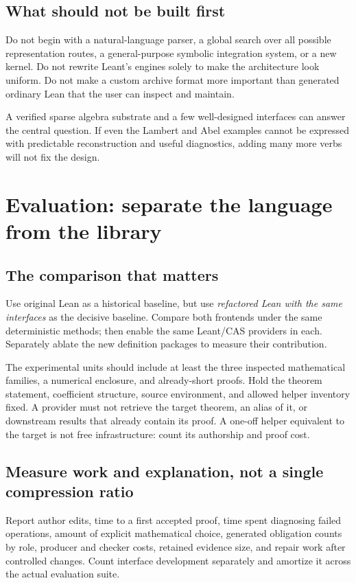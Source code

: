 \documentclass[11pt,a4paper]{article}
\theoremstyle{definition}
\theoremstyle{remark}
\begin{document}
\subsection{What should not be built first}
Do not begin with a natural-language parser, a global search over all possible representation routes, a general-purpose symbolic integration system, or a new kernel. Do not rewrite Leant's engines solely to make the architecture look uniform. Do not make a custom archive format more important than generated ordinary Lean that the user can inspect and maintain.

A verified sparse algebra substrate and a few well-designed interfaces can answer the central question. If even the Lambert and Abel examples cannot be expressed with predictable reconstruction and useful diagnostics, adding many more verbs will not fix the design.

\section{Evaluation: separate the language from the library}\label{sec:evaluation}
\subsection{The comparison that matters}
Use original Lean as a historical baseline, but use \emph{refactored Lean with the same interfaces} as the decisive baseline. Compare both frontends under the same deterministic methods; then enable the same Leant/CAS providers in each. Separately ablate the new definition packages to measure their contribution.

The experimental units should include at least the three inspected mathematical families, a numerical enclosure, and already-short proofs. Hold the theorem statement, coefficient structure, source environment, and allowed helper inventory fixed. A provider must not retrieve the target theorem, an alias of it, or downstream results that already contain its proof. A one-off helper equivalent to the target is not free infrastructure: count its authorship and proof cost.

\subsection{Measure work and explanation, not a single compression ratio}
Report author edits, time to a first accepted proof, time spent diagnosing failed operations, amount of explicit mathematical choice, generated obligation counts by role, producer and checker costs, retained evidence size, and repair work after controlled changes. Count interface development separately and amortize it across the actual evaluation suite.
\end{document}
